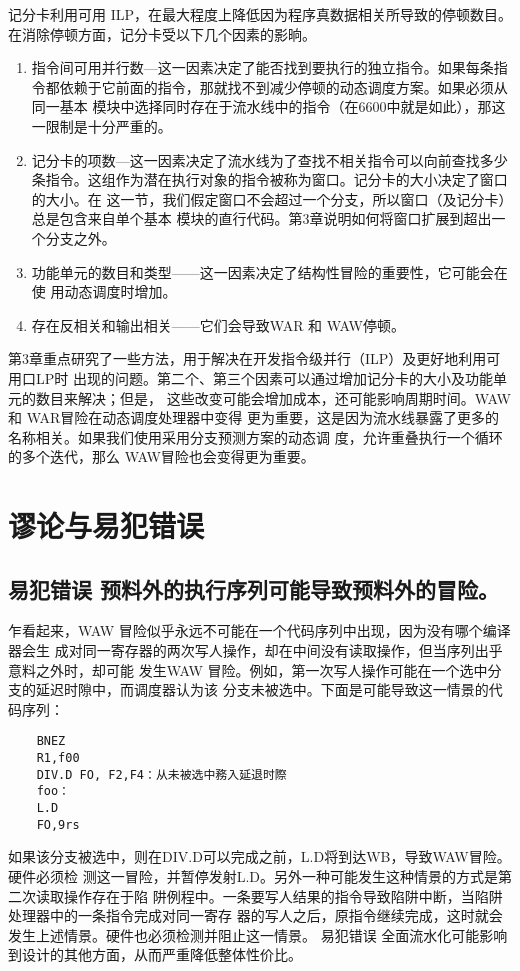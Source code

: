 记分卡利用可用 ILP，在最大程度上降低因为程序真数据相关所导致的停顿数目。
在消除停顿方面，记分卡受以下几个因素的影晌。

\begin{enumerate}
    \item 指令间可用并行数—这一因素决定了能否找到要执行的独立指令。如果每条指
    令都依赖于它前面的指令，那就找不到减少停顿的动态调度方案。如果必须从同一基本
    模块中选择同时存在于流水线中的指令（在6600中就是如此），那这一限制是十分严重的。
    \item 记分卡的项数—这一因素决定了流水线为了查找不相关指令可以向前查找多少
    条指令。这组作为潜在执行对象的指令被称为窗口。记分卡的大小决定了窗口的大小。在
    这一节，我们假定窗口不会超过一个分支，所以窗口（及记分卡）总是包含来自单个基本
    模块的直行代码。第3章说明如何将窗口扩展到超出一个分支之外。
    \item 功能单元的数目和类型——这一因素决定了结构性冒险的重要性，它可能会在使
    用动态调度时增加。
    \item 存在反相关和输出相关——它们会导致WAR 和 WAW停顿。
\end{enumerate}

第3章重点研究了一些方法，用于解决在开发指令级并行（ILP）及更好地利用可用口LP时
出现的问题。第二个、第三个因素可以通过增加记分卡的大小及功能单元的数目来解决；但是，
这些改变可能会增加成本，还可能影响周期时间。WAW 和 WAR冒险在动态调度处理器中变得
更为重要，这是因为流水线暴露了更多的名称相关。如果我们使用采用分支预测方案的动态调
度，允许重叠执行一个循环的多个迭代，那么 WAW冒险也会变得更为重要。

\section{谬论与易犯错误}
\subsection{易犯错误 预料外的执行序列可能导致预料外的冒险。}
乍看起来，WAW 冒险似乎永远不可能在一个代码序列中出现，因为没有哪个编译器会生
成对同一寄存器的两次写人操作，却在中间没有读取操作，但当序列出乎意料之外时，却可能
发生WAW 冒险。例如，第一次写人操作可能在一个选中分支的延迟时隙中，而调度器认为该
分支未被选中。下面是可能导致这一情景的代码序列：

\begin{verbatim}
    BNEZ
    R1,f00
    DIV.D FO, F2,F4：从未被选中務入延退时際
    foo：
    L.D
    FO,9rs
\end{verbatim}
如果该分支被选中，则在DIV.D可以完成之前，L.D将到达WB，导致WAW冒险。硬件必须检
测这一冒险，并暂停发射L.D。另外一种可能发生这种情景的方式是第二次读取操作存在于陷
阱例程中。一条要写人结果的指令导致陷阱中断，当陷阱处理器中的一条指令完成对同一寄存
器的写人之后，原指令继续完成，这时就会发生上述情景。硬件也必须检测并阻止这一情景。
易犯错误 全面流水化可能影响到设计的其他方面，从而严重降低整体性价比。

